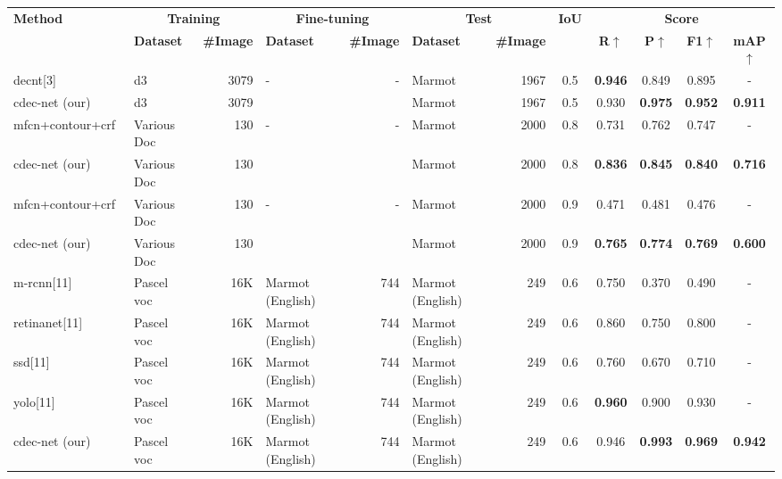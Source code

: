 \documentclass[a4paper,conference]{IEEEtran}
\begin{document}
\begin{table*}[ht!]
\addtolength{\tabcolsep}{-2.7pt}
\begin{center}
\begin{tabular}{|l| l | r|l |r|l|r| c| c c c c|} \hline
\textbf{Method} &\multicolumn{2}{|c|}{\textbf{Training}} &\multicolumn{2}{|c|}{\textbf{Fine-tuning}} &\multicolumn{2}{|c|}{\textbf{Test}} &\textbf{IoU} & \multicolumn{4}{|c|}{\textbf{Score}} \\ \cline{2-7} \cline{9-12}
  &\textbf{Dataset} &\textbf{\#Image} &\textbf{Dataset} &\textbf{\#Image} &\textbf{Dataset} &\textbf{\#Image} &  &\textbf{R}$\uparrow$ &\textbf{P}$\uparrow$ &\textbf{F1}$\uparrow$ &\textbf{mAP}$\uparrow$ \\ \hline  
{\sc d}e{\sc cnt}[3] &{\sc d3} &3079 &- &- &Marmot &1967 &0.5 &\textbf{0.946} &0.849 &0.895 &- \\ 
{\sc cd}e{\sc c-n}et (our) &{\sc d3} &3079 & & &Marmot &1967 &0.5 &0.930 &\textbf{0.975} &\textbf{0.952} &\textbf{0.911} \\ \hhline{|=|=|=|=|=|=|=|=|====|}
{\sc mfcn}+contour+{\sc crf}~\cite{he2017multi} &Various Doc &130 &- &- &Marmot &2000 &0.8 &0.731 &0.762 &0.747 &- \\ 
{\sc cd}e{\sc c-n}et (our) &Various Doc &130 & & &Marmot &2000 &0.8 &\textbf{0.836} &\textbf{0.845} &\textbf{0.840} &\textbf{0.716}  \\ \hhline{|=|=|=|=|=|=|=|=|====|}
{\sc mfcn}+contour+{\sc crf}~\cite{he2017multi} &Various Doc &130 &- &- &Marmot &2000 &0.9 &0.471 &0.481 &0.476 &- \\ 
{\sc cd}e{\sc c-n}et (our) &Various Doc &130 & & &Marmot &2000 &0.9 &\textbf{0.765} &\textbf{0.774} &\textbf{0.769} &\textbf{0.600} \\ \hhline{|=|=|=|=|=|=|=|=|====|}
{\sc m-rcnn}[11] &Pascel {\sc voc} &16K &Marmot (English) &744 &Marmot (English) &249 &0.6 &0.750 &0.370 &0.490 &- \\
{\sc r}etina{\sc n}et[11] &Pascel {\sc voc} &16K &Marmot (English) &744 &Marmot (English) &249 &0.6 &0.860 &0.750 &0.800 &- \\
{\sc ssd}[11] &Pascel {\sc voc} &16K &Marmot (English) &744 &Marmot (English) &249 &0.6 &0.760 &0.670 &0.710 &- \\
{\sc yolo}[11] &Pascel {\sc voc} &16K &Marmot (English) &744 &Marmot (English) &249 &0.6 &\textbf{0.960} &0.900 &0.930 &- \\
{\sc cd}e{\sc c-n}et (our) &Pascel {\sc voc} &16K &Marmot (English) &744 &Marmot (English) &249 &0.6 &0.946 &\textbf{0.993} &\textbf{0.969} &\textbf{0.942} \\ 

\end{tabular}
\end{center}
\end{table*}
\end{document}
